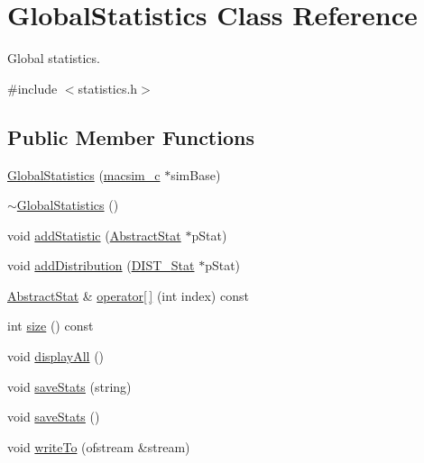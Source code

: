 \hypertarget{classGlobalStatistics}{
\section{GlobalStatistics Class Reference}
\label{classGlobalStatistics}
}


Global statistics.  




{\ttfamily \#include $<$statistics.h$>$}

\subsection*{Public Member Functions}
\begin{DoxyCompactItemize}
\item 
\hyperlink{classGlobalStatistics_a73e7e79eef6bf08d9fd2df8acaf64689}{GlobalStatistics} (\hyperlink{classmacsim__c}{macsim\_\-c} $\ast$simBase)
\item 
\hyperlink{classGlobalStatistics_a26ae065660443e08ffdadf487a5689fd}{$\sim$GlobalStatistics} ()
\item 
void \hyperlink{classGlobalStatistics_a85920b29a4c79e2cc82fd85e4e52c848}{addStatistic} (\hyperlink{classAbstractStat}{AbstractStat} $\ast$pStat)
\item 
void \hyperlink{classGlobalStatistics_a8d9ba4f1f47f24cba8382a6f670b2159}{addDistribution} (\hyperlink{classDIST__Stat}{DIST\_\-Stat} $\ast$pStat)
\item 
\hyperlink{classAbstractStat}{AbstractStat} \& \hyperlink{classGlobalStatistics_aa8ddebd957eaa94c26b97025b53ae0dd}{operator\mbox{[}$\,$\mbox{]}} (int index) const 
\item 
int \hyperlink{classGlobalStatistics_acfb5976eb3bc88f841c8a406e8f58ae0}{size} () const 
\item 
void \hyperlink{classGlobalStatistics_a79d14f876c81aeab5ea680ca1b45c9f6}{displayAll} ()
\item 
void \hyperlink{classGlobalStatistics_ab4555f6275660624327db0f7e1f40469}{saveStats} (string)
\item 
void \hyperlink{classGlobalStatistics_a94b427c80f2d06030de32dbccd8e8713}{saveStats} ()
\item 
void \hyperlink{classGlobalStatistics_a28dca41488c27da294bc36f011f8d4fd}{writeTo} (ofstream \&stream)
\end{DoxyCompactItemize}

